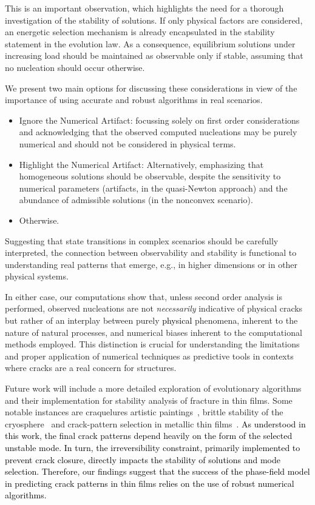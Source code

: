 This is an important observation, which highlights the need for a thorough investigation of the stability of solutions. 
If only physical factors are considered, an energetic selection mechanism is already encapsulated in the stability statement in the evolution law. As a consequence, equilibrium solutions under increasing load should be maintained as observable only if stable, assuming that no nucleation should occur otherwise.

We present two main options for discussing these considerations in view of the importance of using accurate and robust algorithms in real scenarios.

\begin{itemize}
    \item 
    Ignore the Numerical Artifact: focussing solely on first order considerations and acknowledging that the observed computed nucleations may be purely numerical and should not be considered in physical terms.
    \item 
    Highlight the Numerical Artifact: Alternatively, emphasizing that homogeneous solutions should be observable, despite 
    the sensitivity to numerical parameters (artifacts, in the quasi-Newton approach) and the abundance of admissible solutions (in the nonconvex scenario).
    \item 
    Otherwise.
\end{itemize}

Suggesting that state transitions in complex scenarios should be carefully interpreted, the connection between observability and stability is functional to understanding real patterns that emerge, e.g., in higher dimensions or in other physical systems.

In either case, our computations show that, unless second order analysis is performed, observed nucleations are not \emph{necessarily} indicative of physical cracks but rather of an interplay between purely   \textcolor{black}{physical} phenomena, inherent to the nature of natural processes, and numerical biases inherent to the computational methods employed. This distinction is crucial for understanding the limitations and proper application of numerical techniques as predictive tools in contexts where cracks are a real concern for structures.

Future work will include a more detailed exploration of evolutionary algorithms and their implementation for stability analysis of fracture in thin films. Some notable instances are craquelures artistic paintings~\cite{fuster-lopez:2020-picassos, Bosco:2020aa,Bosco:2021},  brittle stability of the cryosphere~\cite{weiss:2017-linking, tollefson:2017-giant, Sun:2023aa, Millan:2023aa} and crack-pattern selection in metallic thin films~\cite{Faurie2019-to}. \textcolor{black}{As understood in this work, the final crack patterns depend heavily on the form of the selected unstable mode. In turn, the irreversibility constraint, primarily implemented to prevent crack closure, directly impacts the stability of solutions and mode selection. Therefore, our findings suggest that the success of the phase-field model in predicting crack patterns in thin films relies on the use of robust numerical algorithms.}

